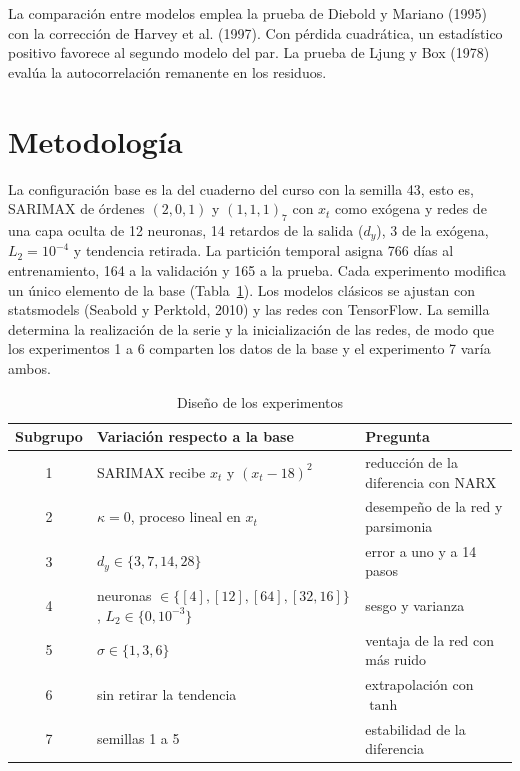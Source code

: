 \documentclass[11pt,letterpaper]{article}
\begin{document}
La comparación entre modelos emplea la prueba de Diebold y Mariano (1995) con la corrección de Harvey et al. (1997). Con pérdida cuadrática, un estadístico positivo favorece al segundo modelo del par. La prueba de Ljung y Box (1978) evalúa la autocorrelación remanente en los residuos.

\section{Metodología}

La configuración base es la del cuaderno del curso con la semilla 43, esto es, SARIMAX de órdenes $(2,0,1)$ y $(1,1,1)_7$ con $x_t$ como exógena y redes de una capa oculta de 12 neuronas, 14 retardos de la salida ($d_y$), 3 de la exógena, $L_2=10^{-4}$ y tendencia retirada. La partición temporal asigna 766 días al entrenamiento, 164 a la validación y 165 a la prueba. Cada experimento modifica un único elemento de la base (Tabla~\ref{tab:diseno}). Los modelos clásicos se ajustan con statsmodels (Seabold y Perktold, 2010) y las redes con TensorFlow. La semilla determina la realización de la serie y la inicialización de las redes, de modo que los experimentos 1 a 6 comparten los datos de la base y el experimento 7 varía ambos.

\begin{table}[!htb]
    \centering
    \caption{Diseño de los experimentos}
    \label{tab:diseno}
    \footnotesize
    \begin{tabular}{c l l}
        \toprule
        \textbf{Subgrupo} & \textbf{Variación respecto a la base} & \textbf{Pregunta} \\
        \midrule
        1 & SARIMAX recibe $x_t$ y $(x_t-18)^2$ & reducción de la diferencia con NARX \\
        2 & $\kappa=0$, proceso lineal en $x_t$ & desempeño de la red y parsimonia \\
        3 & $d_y\in\{3,7,14,28\}$ & error a uno y a 14 pasos \\
        4 & neuronas $\in\{[4],[12],[64],[32,16]\}$, $L_2\in\{0,10^{-3}\}$ & sesgo y varianza \\
        5 & $\sigma\in\{1,3,6\}$ & ventaja de la red con más ruido \\
        6 & sin retirar la tendencia & extrapolación con $\tanh$ \\
        7 & semillas 1 a 5 & estabilidad de la diferencia \\
        \bottomrule
    \end{tabular}
\end{table}
\end{document}
